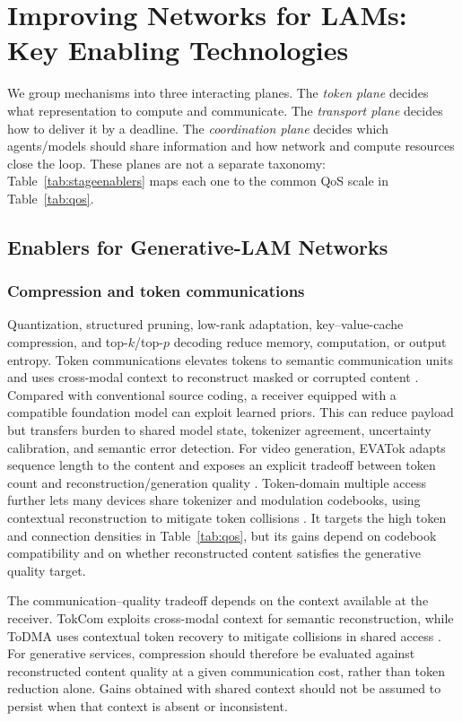 \documentclass[letterpaper,journal]{IEEEtran}
\begin{document}
\section{Improving Networks for LAMs: Key Enabling Technologies}
\label{sec:enablers}

We group mechanisms into three interacting planes. The \emph{token plane}
decides what representation to compute and communicate. The
\emph{transport plane} decides how to deliver it by a deadline. The
\emph{coordination plane} decides which agents/models should share
information and how network and compute resources close the loop. These planes
are not a separate taxonomy: Table~\ref{tab:stageenablers} maps each one to the
common QoS scale in Table~\ref{tab:qos}.

\subsection{Enablers for Generative-LAM Networks}
\subsubsection{Compression and token communications}
Quantization, structured pruning, low-rank adaptation, key--value-cache
compression, and top-$k$/top-$p$ decoding reduce memory, computation, or
output entropy. Token communications elevates tokens to semantic
communication units and uses cross-modal context to reconstruct masked or
corrupted content \cite{tokcom}. Compared with conventional source coding, a
receiver equipped with a compatible foundation model can exploit learned
priors. This can reduce payload but transfers burden to shared model state,
tokenizer agreement, uncertainty calibration, and semantic error detection.
For video generation, EVATok adapts sequence length to the content and exposes
an explicit tradeoff between token count and reconstruction/generation quality
\cite{evatok}.
Token-domain multiple access further lets many devices share tokenizer and
modulation codebooks, using contextual reconstruction to mitigate token
collisions \cite{todma}. It targets the high token and connection densities in
Table~\ref{tab:qos}, but its gains depend on codebook compatibility and on
whether reconstructed content satisfies the generative quality target.

The communication--quality tradeoff depends on the context available at the
receiver. TokCom exploits cross-modal context for semantic reconstruction,
while ToDMA uses contextual token recovery to mitigate collisions in shared
access \cite{tokcom,todma}. For generative services, compression should
therefore be evaluated against reconstructed content quality at a given
communication cost, rather than token reduction alone. Gains obtained with
shared context should not be assumed to persist when that context is absent
or inconsistent.
\end{document}
